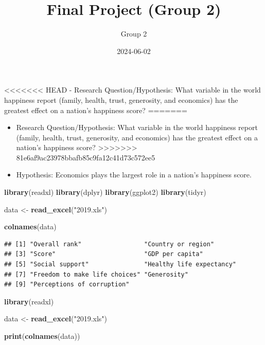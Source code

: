 \documentclass[
  11pt,
]{article}
\title{Final Project (Group 2)}
\author{Group 2}
\date{2024-06-02}
\newenvironment{Shaded}{\begin{snugshade}}{\end{snugshade}}
\newcommand{\FunctionTok}[1]{\textcolor[rgb]{0.13,0.29,0.53}{\textbf{#1}}}
\newcommand{\NormalTok}[1]{#1}
\newcommand{\OtherTok}[1]{\textcolor[rgb]{0.56,0.35,0.01}{#1}}
\newcommand{\StringTok}[1]{\textcolor[rgb]{0.31,0.60,0.02}{#1}}
\begin{document}
\maketitle

\textless\textless\textless\textless\textless\textless\textless{} HEAD -
Research Question/Hypothesis: What variable in the world happiness
report (family, health, trust, generosity, and economics) has the
greatest effect on a nation's happiness score? =======

\begin{itemize}
\item
  Research Question/Hypothesis: What variable in the world happiness
  report (family, health, trust, generosity, and economics) has the
  greatest effect on a nation's happiness score?
  \textgreater\textgreater\textgreater\textgreater\textgreater\textgreater\textgreater{}
  81e6af9ac23978bbafb85c9fa12c41d73c572ee5
\item
  Hypothesis: Economics plays the largest role in a nation's happiness
  score.
\end{itemize}

\begin{Shaded}
\begin{Highlighting}[]
\FunctionTok{library}\NormalTok{(readxl)}
\FunctionTok{library}\NormalTok{(dplyr)}
\FunctionTok{library}\NormalTok{(ggplot2)}
\FunctionTok{library}\NormalTok{(tidyr)}

\NormalTok{data }\OtherTok{\textless{}{-}} \FunctionTok{read\_excel}\NormalTok{(}\StringTok{"2019.xls"}\NormalTok{)}

\FunctionTok{colnames}\NormalTok{(data)}
\end{Highlighting}
\end{Shaded}

\begin{verbatim}
## [1] "Overall rank"                 "Country or region"           
## [3] "Score"                        "GDP per capita"              
## [5] "Social support"               "Healthy life expectancy"     
## [7] "Freedom to make life choices" "Generosity"                  
## [9] "Perceptions of corruption"
\end{verbatim}

\begin{Shaded}
\begin{Highlighting}[]
\FunctionTok{library}\NormalTok{(readxl)}

\NormalTok{data }\OtherTok{\textless{}{-}} \FunctionTok{read\_excel}\NormalTok{(}\StringTok{"2019.xls"}\NormalTok{)}

\FunctionTok{print}\NormalTok{(}\FunctionTok{colnames}\NormalTok{(data))}
\end{Highlighting}
\end{Shaded}
\end{document}
